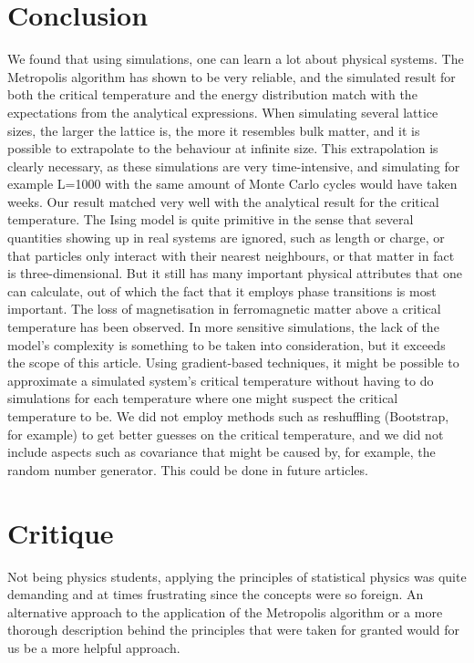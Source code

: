 \documentclass[10pt,a4paper]{article}
\begin{document}
\section{Conclusion}
We found that using simulations, one can learn a lot about physical systems. The Metropolis algorithm has shown to be very reliable, and the simulated result for both the critical temperature and the energy distribution match with the expectations from the analytical expressions. When simulating several lattice sizes, the larger the lattice is, the more it resembles bulk matter, and it is possible to extrapolate to the behaviour at infinite size. This extrapolation is clearly necessary, as these simulations are very time-intensive, and simulating for example L=1000 with the same amount of Monte Carlo cycles would have taken weeks. Our result matched very well with the analytical result for the critical temperature. The Ising model is quite primitive in the sense that several quantities showing up in real systems are ignored, such as length or charge, or that particles only interact with their nearest neighbours, or that matter in fact is three-dimensional. But it still has many important physical attributes that one can calculate, out of which the fact that it employs phase transitions is most important. The loss of magnetisation in ferromagnetic matter above a critical temperature has been observed. In more sensitive simulations, the lack of the model's complexity is something to be taken into consideration, but it exceeds the scope of this article. Using gradient-based techniques, it might be possible to approximate a simulated system's critical temperature without having to do simulations for each temperature where one might suspect the critical temperature to be. 
We did not employ methods such as reshuffling (Bootstrap, for example) to get better guesses on the critical temperature, and we did not include aspects such as covariance that might be caused by, for example, the random number generator. This could be done in future articles.

\section{Critique}
Not being physics students, applying the principles of statistical physics was quite demanding and at times frustrating since the concepts were so foreign. An alternative approach to the application of the Metropolis algorithm or a more thorough description behind the principles that were taken for granted would for us be a more helpful approach.
\end{document}
